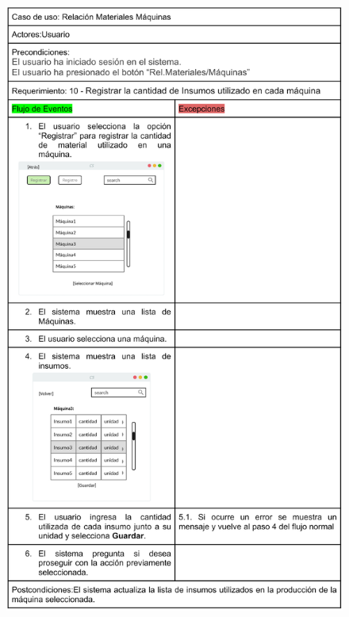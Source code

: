 \documentclass{article}
\begin{document}
    
    \begin{figure}
        \includegraphics[width=1\linewidth]{imagenes/registrar_insumos_maquina.png}  
    \end{figure}
    
\end{document}
